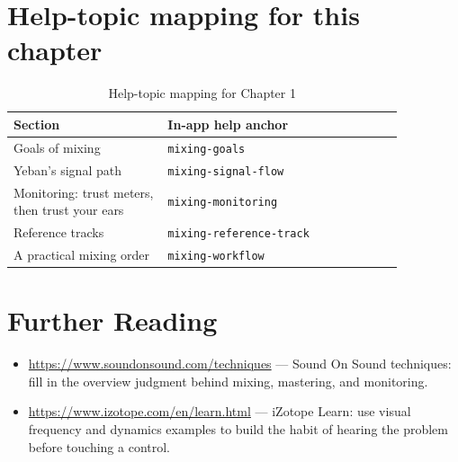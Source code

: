 \section{Help-topic mapping for this chapter}

\begin{table}[htbp]
\centering
\small
\begin{tabular}{@{}p{0.34\linewidth}p{0.52\linewidth}@{}}
\hline
Section & In-app help anchor \\
\hline
Goals of mixing & \texttt{mixing-goals} \\
Yeban's signal path & \texttt{mixing-signal-flow} \\
Monitoring: trust meters, then trust your ears & \texttt{mixing-monitoring} \\
Reference tracks & \texttt{mixing-reference-track} \\
A practical mixing order & \texttt{mixing-workflow} \\
\hline
\end{tabular}
\caption{Help-topic mapping for Chapter 1}
\end{table}

\section*{Further Reading}
\begin{itemize}[leftmargin=1.5em]
\item \url{https://www.soundonsound.com/techniques} — Sound On Sound techniques: fill in the overview judgment behind mixing, mastering, and monitoring.
\item \url{https://www.izotope.com/en/learn.html} — iZotope Learn: use visual frequency and dynamics examples to build the habit of hearing the problem before touching a control.
\end{itemize}
